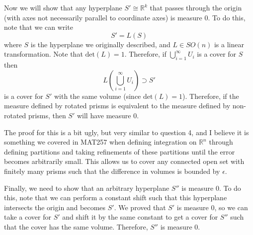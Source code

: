 \documentclass{article}
\numberwithin{equation}{section}
\begin{document}
\begin{enumerate}
\begin{enumerate}[label=(\alph*)]
        Now we will show that any hyperplane $S' \cong \mathbb{R}^k$ that passes through the origin (with axes not necessarily parallel to coordinate axes) is measure 0. To do this, note that we can write 
        \begin{equation}
            S' = L(S)
        \end{equation}
        where $S$ is the hyperplane we originally described, and $L \in SO(n)$ is a linear transformation. Note that $\text{det}(L) = 1.$ Therefore, if $\bigcup_{i=1}^{\infty}U_i$ is a cover for $S$ then 
        \begin{equation}
            L\left(\bigcup_{i=1}^{\infty} U_i\right) \supset S'
        \end{equation}
        is a cover for $S'$ with the same volume (since $\text{det}(L)=1$). Therefore, if the measure defined by rotated prisms is equivalent to the measure defined by non-rotated prisms, then $S'$ will have measure 0.

        The proof for this is a bit ugly, but very similar to question 4, and I believe it is something we covered in MAT257 when defining integration on $\mathbb{R}^n$ through defining partitions and taking refinements of these partitions until the error becomes arbitrarily small. This allows us to cover any connected open set with finitely many prisms such that the difference in volumes is bounded by $\epsilon.$

        Finally, we need to show that an arbitrary hyperplane $S''$ is measure 0. To do this, note that we can perform a constant shift such that this hyperplane intersects the origin and becomes $S'.$ We proved that $S'$ is measure 0, so we can take a cover for $S'$ and shift it by the same constant to get a cover for $S''$ such that the cover has the same volume. Therefore, $S''$ is measure 0.
        
    \end{enumerate}
\end{enumerate}
\end{document}
